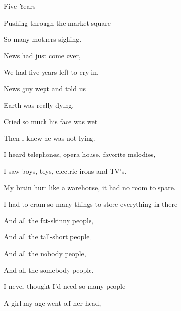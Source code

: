 \begin{song}{Five Years}{
	
	\chordset[Verse]{ \GMaj \Em \AMaj \CMajBassG }

	\chordset[Bridge]{ \Am \CMajBassG \GMaj \DSeven}
	
}

\begin{songverse}

Pushing through the market square

So many mothers sighing.

News had just come over,

We had five years left to cry in.


News guy wept and told us 

Earth was really dying.

Cried so much his face was wet

Then I knew he was not lying.

\end{songverse}

\begin{songverse}

I heard telephones, opera house, favorite melodies,

I saw boys, toys, electric irons and TV's.

My brain hurt like a warehouse, it had no room to spare.               
 
I had to cram so many things to store everything in there

\end{songverse}

\begin{songverse*}[Bridge]

And all the fat-skinny \mbox{people, \quad {}}

And all the tall-short people,\quad {}

And all the nobody people, \quad {}
                      
And all the somebody people.

I never thought I'd need so many people \quad {}

\end{songverse*}

\begin{songverse}                                 
 A girl my age went off her head,
 

\end{songverse}
\end{song}
